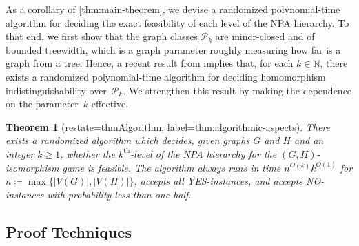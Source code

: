\documentclass[a4paper,onecolumn,11pt,accepted=2026-01-06]{quantumarticle}
\theoremstyle{plain}
\newtheorem{thm}{Theorem}[section]
\theoremstyle{remark}
\theoremstyle{definition}
\def\calP{{\mathcal P}} \def\calQ{{\mathcal Q}} \def\calR{{\mathcal R}}
\begin{document}
As a corollary of \cref{thm:main-theorem}, we devise
a randomized polynomial-time algorithm for deciding the exact feasibility of each level of the NPA hierarchy.
To that end, we first show that the graph classes $\calP_k$ are minor-closed and of bounded treewidth, which is a graph parameter roughly measuring how far is a graph from a tree.
Hence, a recent result from \cite{seppelt_algorithmic_2024} implies that, for each $k \in \mathbb{N}$, there exists a randomized polynomial-time algorithm for deciding homomorphism indistinguishability over~$\mathcal{P}_k$.
We strengthen this result by making the dependence on the parameter~$k$ effective.
%

\begin{thm}[restate=thmAlgorithm, label=thm:algorithmic-aspects]
    There exists a randomized algorithm which decides, given graphs $G$ and $H$ and an integer $k\geq 1$,
    whether the $k^{\text{th}}$-level of the NPA hierarchy for the $(G,H)$-isomorphism game is feasible.
    The algorithm always runs in time $n^{O(k)} k^{O(1)}$ for $n \coloneqq \max \{\lvert V(G) \rvert , \lvert V(H) \rvert  \}$, accepts all YES-instances, and accepts NO-instances with probability less than one half.
\end{thm}

\subsection{Proof Techniques}
\end{document}
